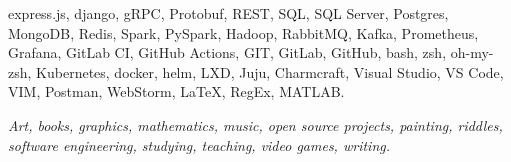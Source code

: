 \documentclass[10pt,a4paper]{article}
\begin{document}
\begin{customitemize}
\begin{customitemize}
{{                        express.js,
                        django,
                        gRPC,
                        Protobuf,
                        REST,
                        SQL,
                        SQL Server,
                        Postgres,
                        MongoDB,
                        Redis,
                        Spark,
                        PySpark,
                        Hadoop,
                        RabbitMQ,
                        Kafka,
                        Prometheus,
                        Grafana,
                        GitLab CI,
                        GitHub Actions,
                        GIT,
                        GitLab,
                        GitHub,
                        bash,
                        zsh,
                        oh-my-zsh,
                        Kubernetes,
                        docker,
                        helm,
                        LXD,
                        Juju,
                        Charmcraft,
                        Visual Studio,
                        VS Code,
                        VIM,
                        Postman,
                        WebStorm,
                        \LaTeX,
                        RegEx,
                        MATLAB.}
              }
    \end{customitemize}
    \item[] 
\end{customitemize}
\sectionrule{}

\begin{customitemize}
    \item[] 
    \begin{customitemize}
        \item {\textit{
                        Art,
                        books,
                        graphics,
                        mathematics,
                        music,
                        open source projects,
                        painting,
                        riddles,
                        software engineering,
                        studying,
                        teaching,
                        video games,
                        writing.
                    }}
    \end{customitemize}
\end{customitemize}
\end{document}
